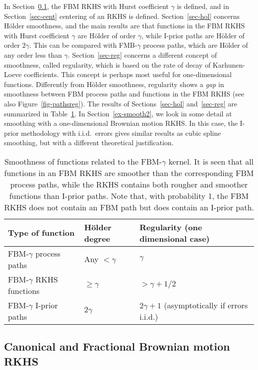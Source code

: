 \documentclass[preprint,12pt,authoryear]{elsarticle}
\begin{document}
In Section~\ref{sec-fbm1}, the FBM RKHS with Hurst coefficient $\gamma$ is defined, and in Section~\ref{sec-cent} centering of an RKHS is defined.
Section~\ref{sec-hol} concerns H\"older smoothness, and the main results are that functions in the FBM RKHS with Hurst coefficient $\gamma$ are H\"older of order $\gamma$, while I-prior paths are H\"older of order $2\gamma$. This can be compared with FMB-$\gamma$ process paths, which are H\"older of any order less than $\gamma$. 
Section~\ref{sec-reg} concerns a different concept of smoothness, called regularity, which is based on the rate of decay of Karhunen-Loeve coefficients. 
This concept is perhaps most useful for one-dimensional functions. Differently from H\"older smoothness, regularity shows a {\em gap} in smoothness between FBM process paths and functions in the FBM RKHS (see also Figure~\ref{fig-pathsreg}).
The results of Sections~\ref{sec-hol} and~\ref{sec-reg} are summarized in Table~\ref{tbl-smooth}.
In Section~\ref{ex-smooth2}, we look in some detail at smoothing with a one-dimensional Brownian motion RKHS. In this case, the I-prior methodology with i.i.d.\  errors gives similar results as cubic spline smoothing, but with a different theoretical justification. 



\begin{table}
	\begin{tabular}{lll}
		Type of function & H\"older degree & Regularity (one dimensional case)  \\ \hline
		FBM-$\gamma$ process paths  & Any $<\gamma$    & $\gamma$   \\
		FBM-$\gamma$ RKHS functions & $\ge\gamma$               & $>\gamma+1/2$ \\
		FBM-$\gamma$ I-prior paths  & $2\gamma$              & $2\gamma+1$ (asymptotically if errors i.i.d.)
	\end{tabular}
	\caption{Smoothness of functions related to the FBM-$\gamma$ kernel. It is seen that all functions in an FBM RKHS are smoother than the corresponding FBM process paths, while the RKHS contains both rougher and smoother functions than I-prior paths. Note that, with probability 1, the FBM RKHS does not contain an FBM path but does contain an I-prior path.}
	\label{tbl-smooth}
\end{table}



\subsection{Canonical and Fractional Brownian motion RKHS}\label{sec-fbm1}
\end{document}
